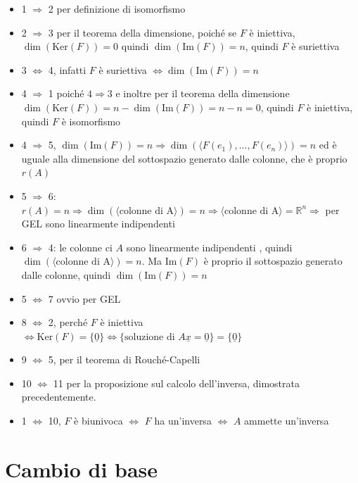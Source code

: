 \documentclass[
  a4paper,
]{article}
\providecommand{\tightlist}{%
  \setlength{\itemsep}{0pt}\setlength{\parskip}{0pt}}
\providecommand{\tightlist}{}
\begin{document}
\begin{proofbox}
\begin{itemize}
\tightlist
\item
  1 \(\Rightarrow\) 2 per definizione di isomorfismo
\item
  2 \(\Rightarrow\) 3 per il teorema della dimensione, poiché se \(F\) è
  iniettiva, \(\dim(\text{Ker}(F)) = 0\) quindi
  \(\dim(\text{Im}(F)) = n\), quindi \(F\) è suriettiva
\item
  3 \(\iff\) 4, infatti \(F\) è suriettiva \(\iff \dim(\text{Im}(F))=n\)
\item
  4 \(\Rightarrow\) 1 poiché \(4 \Rightarrow 3\) e inoltre per il
  teorema della dimensione
  \(\dim(\text{Ker}(F)) = n - \dim(\text{Im}(F)) = n - n =0\), quindi
  \(F\) è iniettiva, quindi \(F\) è isomorfismo
\item
  4 \(\Rightarrow\) 5,
  \(\dim(\text{Im}(F))=n \Rightarrow \dim(\langle F(e_1), ..., F(e_n) \rangle) = n\)
  ed è uguale alla dimensione del sottospazio generato dalle colonne,
  che è proprio \(r(A)\)
\item
  5 \(\Rightarrow\) 6:
  \(r(A) = n \Rightarrow \dim(\langle \text{colonne di A} \rangle) = n \Rightarrow \langle \text{colonne di A} \rangle = \mathbb{R}^n \Rightarrow\)
  per GEL sono linearmente indipendenti
\item
  6 \(\Rightarrow\) 4: le colonne ci \(A\) sono linearmente indipendenti
  , quindi \(\dim(\langle \text{colonne di A} \rangle) = n\). Ma
  \(\text{Im}(F)\) è proprio il sottospazio generato dalle colonne,
  quindi \(\dim(\text{Im}(F))=n\)
\item
  5 \(\iff\) 7 ovvio per GEL
\item
  8 \(\iff\) 2, perché \(F\) è iniettiva
  \(\iff \text{Ker}(F) = \{\underline{0}\} \iff \{\text{soluzione di } A\underline{x} = \underline{0}\} = \{\underline{0}\}\)
\item
  9 \(\iff\) 5, per il teorema di Rouché-Capelli
\item
  10 \(\iff\) 11 per la proposizione sul calcolo dell'inversa,
  dimostrata precedentemente.
\item
  1 \(\iff\) 10, \(F\) è biunivoca \(\iff\) \(F\) ha un'inversa \(\iff\)
  \(A\) ammette un'inversa
\end{itemize}
\end{proofbox}

\newpage

\hypertarget{cambio-di-base}{%
\section{Cambio di base}\label{cambio-di-base}}
\end{document}
